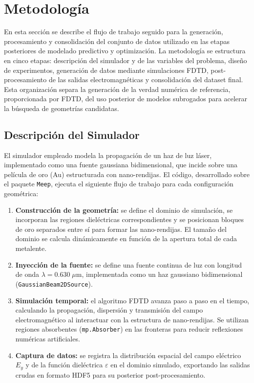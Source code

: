 \section{Metodología}\label{sec:metodologia}

En esta sección se describe el flujo de trabajo seguido para la generación, procesamiento y consolidación del conjunto de datos utilizado en las etapas posteriores de modelado predictivo y optimización. La metodología se estructura en cinco etapas: descripción del simulador y de las variables del problema, diseño de experimentos, generación de datos mediante simulaciones FDTD, post-procesamiento de las salidas electromagnéticas y consolidación del dataset final. Esta organización separa la generación de la verdad numérica de referencia, proporcionada por FDTD, del uso posterior de modelos subrogados para acelerar la búsqueda de geometrías candidatas.

\subsection{Descripción del Simulador}\label{subsec:simulador}

El simulador empleado modela la propagación de un haz de luz láser, implementado como una fuente gaussiana bidimensional, que incide sobre una película de oro (Au) estructurada con nano-rendijas. El código, desarrollado sobre el paquete \texttt{Meep}, ejecuta el siguiente flujo de trabajo para cada configuración geométrica:

\begin{enumerate}
\item \textbf{Construcción de la geometría:} se define el dominio de simulación, se incorporan las regiones dieléctricas correspondientes y se posicionan bloques de oro separados entre sí para formar las nano-rendijas. El tamaño del dominio se calcula dinámicamente en función de la apertura total de cada metalente.

\item \textbf{Inyección de la fuente:} se define una fuente continua de luz con longitud de onda $\lambda = 0.630\;\mu\text{m}$, implementada como un haz gaussiano bidimensional (\texttt{GaussianBeam2DSource}).

\item \textbf{Simulación temporal:} el algoritmo FDTD avanza paso a paso en el tiempo, calculando la propagación, dispersión y transmisión del campo electromagnético al interactuar con la estructura de nano-rendijas. Se utilizan regiones absorbentes (\texttt{mp.Absorber}) en las fronteras para reducir reflexiones numéricas artificiales.

\item \textbf{Captura de datos:} se registra la distribución espacial del campo eléctrico $E_y$ y de la función dieléctrica $\varepsilon$ en el dominio simulado, exportando las salidas crudas en formato HDF5 para su posterior post-procesamiento.

\end{enumerate}

